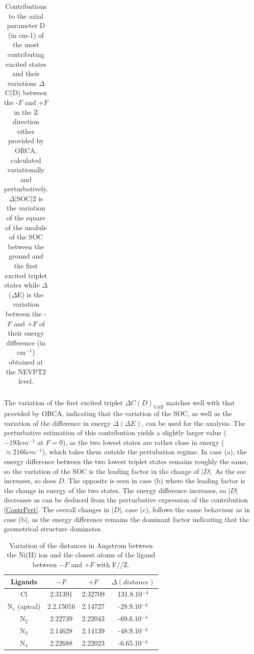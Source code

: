 \documentclass[12pt]{report}
\numberwithin{equation}{section}
\begin{document}
\begin{table}[h]
{\begin{tabular}{c | c | c  c | c c c |c |c}
    \hline
    \end{tabular}
    }
    \caption{Contributions to the axial parameter D (in cm-1) of the most contributing excited states and their variations $\Delta$C(D) between the -$F$ and +$F$ in the Z direction either provided by ORCA, calculated variationally and perturbatively. $\Delta$|SOC|2 is the variation of the square of the module of the SOC between the ground and the first excited triplet states while $\Delta$($\Delta$E) is the variation between the -$F$ and +$F$ of their energy difference (in cm$^{-1}$) obtained at the NEVPT2 level.}
    \label{tab:Contribution_Z}
\end{table}

The variation of the first excited triplet $\Delta C(D)_{VAR}$ matches well with that provided by ORCA, indicating that the variation of the SOC, as well as the variation of the difference in energy $\Delta (\Delta E)$, can be used for the analysis.
The perturbative estimation of this contribution yields a slightly larger value ($-193 cm^{-1}$ at $F=0$), as the two lowest states are rather close in energy ($\approx 2166 cm^{-1}$), which takes them outside the pertubation regime.
In case (a), the energy difference between the two lowest triplet states remains roughly the same, so the variation of the SOC is the leading factor in the change of $|D|$. As the soc increases, so does $D$.
The opposite is seen in case (b) where the leading factor is the change in energy of the two states. 
The energy difference increases, so $|D|$ decreases as can be deduced from the perturbative expression of the contribution \ref{ContrPert}.
The overall changes in $|D|$, case (c), follows the same behaviour as in case (b), as the energy difference remains the dominant factor indicating that the geometrical structure dominates.
\begin{table}[!ht]
    \centering
    \begin{tabular}{| c | c| c | c |}
        \hline
        Ligands & $-F$ & $+F$ &$\Delta(distance)$\\
        \hline
        Cl & 2.31391& 2.32709&  131.8.10$^{-4}$\\
        N$_1$ (apical) & 2.2.15016  & 2.14727 &-28.9.10$^{-4}$\\
        N$_2$ & 2.22739 & 2.22043&-69.6.10$^{-4}$ \\
        N$_3$ & 2.14628& 2.14139&-48.9.10$^{-4}$ \\
        N$_4$ & 2.22688 & 2.22023 &-6.65.10$^{-4}$\\
        \hline
    \end{tabular}
    \caption{Variation of the distances in Angstrom between the Ni(II) ion and the closest atoms of the ligand between $-F$ and $+F$ with F//Z.}
    \label{tab:DistanceZ}
\end{table}
\end{document}
